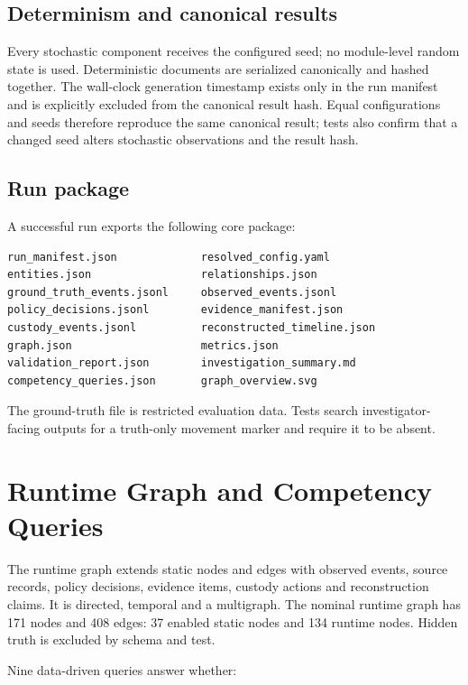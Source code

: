 ﻿\documentclass[11pt,a4paper]{article}
\begin{document}
\subsection{Determinism and canonical results}

Every stochastic component receives the configured seed; no module-level random state is used. Deterministic documents are serialized canonically and hashed together. The wall-clock generation timestamp exists only in the run manifest and is explicitly excluded from the canonical result hash. Equal configurations and seeds therefore reproduce the same canonical result; tests also confirm that a changed seed alters stochastic observations and the result hash.

\subsection{Run package}

A successful run exports the following core package:

\begin{lstlisting}
run_manifest.json             resolved_config.yaml
entities.json                 relationships.json
ground_truth_events.jsonl     observed_events.jsonl
policy_decisions.jsonl        evidence_manifest.json
custody_events.jsonl          reconstructed_timeline.json
graph.json                    metrics.json
validation_report.json        investigation_summary.md
competency_queries.json       graph_overview.svg
\end{lstlisting}

The ground-truth file is restricted evaluation data. Tests search investigator-facing outputs for a truth-only movement marker and require it to be absent.

\section{Runtime Graph and Competency Queries}

The runtime graph extends static nodes and edges with observed events, source records, policy decisions, evidence items, custody actions and reconstruction claims. It is directed, temporal and a multigraph. The nominal runtime graph has 171 nodes and 408 edges: 37 enabled static nodes and 134 runtime nodes. Hidden truth is excluded by schema and test.

Nine data-driven queries answer whether:
\end{document}
